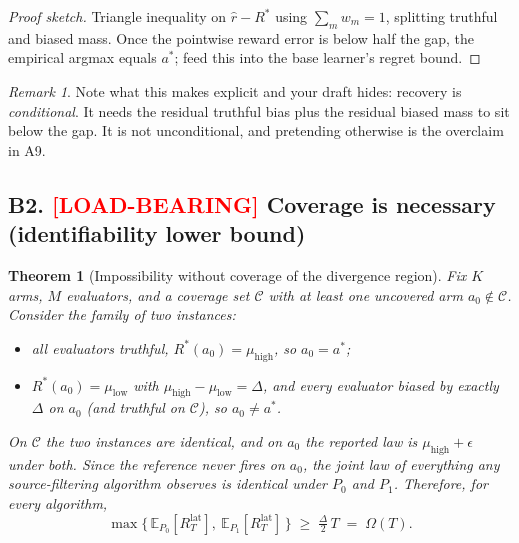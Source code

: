 \documentclass[11pt]{article}
\newtheorem{theorem}{Theorem}
\theoremstyle{definition}
\theoremstyle{remark}
\newtheorem{remark}{Remark}
\newcommand{\Rstar}{R^{\ast}}
\newcommand{\astar}{a^{\ast}}
\newcommand{\Cov}{\mathcal{C}}
\newcommand{\E}{\mathbb{E}}
\begin{document}
\begin{proof}[Proof sketch]
Triangle inequality on $\hat r-\Rstar$ using $\sum_m w_m=1$, splitting truthful and biased mass.
Once the pointwise reward error is below half the gap, the empirical argmax equals $\astar$; feed
this into the base learner's regret bound.
\end{proof}

\begin{remark}
Note what this makes explicit and your draft hides: recovery is \emph{conditional}. It needs the
residual truthful bias plus the residual biased mass to sit below the gap. It is not
unconditional, and pretending otherwise is the overclaim in A9.
\end{remark}

\subsection*{B2. \textcolor{red}{[LOAD-BEARING]} Coverage is necessary (identifiability lower bound)}

\begin{theorem}[Impossibility without coverage of the divergence region]
\label{thm:lower}
Fix $K$ arms, $M$ evaluators, and a coverage set $\Cov$ with at least one uncovered arm
$a_0\notin\Cov$. Consider the family of two instances:
\begin{itemize}[nosep]
\item[$P_0$:] all evaluators truthful, $\Rstar(a_0)=\mu_{\mathrm{high}}$, so $a_0=\astar$;
\item[$P_1$:] $\Rstar(a_0)=\mu_{\mathrm{low}}$ with $\mu_{\mathrm{high}}-\mu_{\mathrm{low}}=\Delta$,
and every evaluator biased by exactly $\Delta$ on $a_0$ (and truthful on $\Cov$), so
$a_0\neq\astar$.
\end{itemize}
On $\Cov$ the two instances are identical, and on $a_0$ the reported law is
$\mu_{\mathrm{high}}+\epsilon$ under \emph{both}. Since the reference never fires on $a_0$, the
joint law of everything any source-filtering algorithm observes is identical under $P_0$ and $P_1$.
Therefore, for every algorithm,
\[
\max\big\{\,\E_{P_0}[R^{\mathrm{lat}}_T],\ \E_{P_1}[R^{\mathrm{lat}}_T]\,\big\}\;\ge\;\tfrac{\Delta}{2}\,T
\;=\;\Omega(T).
\]
\end{theorem}
\end{document}
